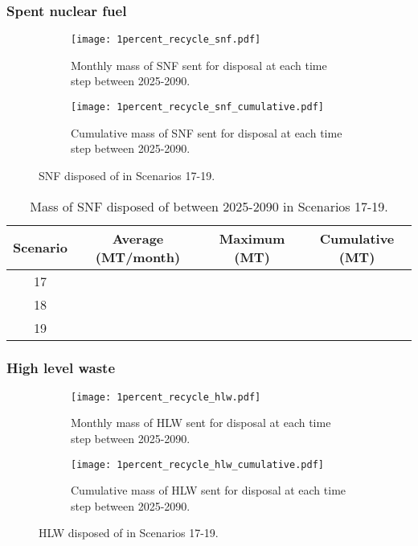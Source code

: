 \subsubsection{Spent nuclear fuel}

\begin{figure}[h!]
    \centering
    \begin{subfigure}[b]{0.49\textwidth}
        \centering
        \texttt{[image: 1percent\_recycle\_snf.pdf]}
        \caption{Monthly mass of SNF sent for disposal 
        at each time step between 2025-2090.}
        \label{fig:1percent_recycle_snf_all}
    \end{subfigure}
    \hfill
    \begin{subfigure}[b]{0.49\textwidth}
        \centering
        \texttt{[image: 1percent\_recycle\_snf\_cumulative.pdf]}
        \caption{Cumulative mass of SNF sent for disposal 
        at each time step between 2025-2090.}
        \label{fig:1percent_recycle_snf_cumulative}
    \end{subfigure}
       \caption{\gls{SNF} disposed of in Scenarios 17-19.}
       \label{fig:1percent_recycle_snf}
\end{figure}

\begin{table}[h!]
    \centering 
    \caption{Mass of SNF disposed of between 2025-2090 in 
    Scenarios 17-19.}
    \label{tab:snf_17-19}
    \begin{tabular}{c c c c}
        \hline 
        Scenario & Average (MT/month) & Maximum (MT) & Cumulative (MT) \\
        \hline
        17 & & & \\
        18 & & & \\
        19 & & & \\
        \hline
    \end{tabular}
\end{table}


\subsubsection{High level waste}

\begin{figure}[h!]
    \centering
    \begin{subfigure}[b]{0.49\textwidth}
        \centering
        \texttt{[image: 1percent\_recycle\_hlw.pdf]}
        \caption{Monthly mass of HLW sent for disposal 
        at each time step between 2025-2090.}
        \label{fig:1percent_recycle_hlw_all}
    \end{subfigure}
    \hfill
    \begin{subfigure}[b]{0.49\textwidth}
        \centering
        \texttt{[image: 1percent\_recycle\_hlw\_cumulative.pdf]}
        \caption{Cumulative mass of HLW sent for disposal 
        at each time step between 2025-2090.}
        \label{fig:1percent_recycle_hlw_cumulative}
    \end{subfigure}
       \caption{\gls{HLW} disposed of in Scenarios 17-19.}
       \label{fig:1percent_recycle_hlw}
\end{figure}

